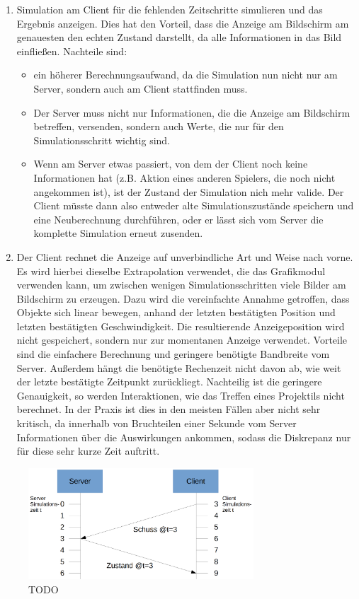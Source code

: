 \begin{enumerate}
\item Simulation am Client für die fehlenden Zeitschritte simulieren und das Ergebnis anzeigen. Dies hat den Vorteil, dass die Anzeige am Bildschirm am genauesten den echten Zustand darstellt, da alle Informationen in das Bild einfließen. Nachteile sind:
\begin{itemize}
 \item ein höherer Berechnungsaufwand, da die Simulation nun nicht nur am Server, sondern auch am Client stattfinden muss. 
 \item Der Server muss nicht nur Informationen, die die Anzeige am Bildschirm betreffen, versenden, sondern auch Werte, die nur für den Simulationsschritt wichtig sind.
 \item Wenn am Server etwas passiert, von dem der Client noch keine Informationen hat (z.B. Aktion eines anderen Spielers, die noch nicht angekommen ist), ist der Zustand der Simulation nich mehr valide. Der Client müsste dann also entweder alte Simulationszustände speichern und eine Neuberechnung durchführen, oder er lässt sich vom Server die komplette Simulation erneut zusenden.
\end{itemize}
\item Der Client rechnet die Anzeige auf unverbindliche Art und Weise nach vorne. Es wird hierbei dieselbe Extrapolation verwendet, die das Grafikmodul verwenden kann, um zwischen wenigen Simulationsschritten viele Bilder am Bildschirm zu erzeugen. Dazu wird die vereinfachte Annahme getroffen, dass Objekte sich linear bewegen, anhand der letzten bestätigten Position und letzten bestätigten Geschwindigkeit. Die resultierende Anzeigeposition wird nicht gespeichert, sondern nur zur momentanen Anzeige verwendet. Vorteile sind die einfachere Berechnung und geringere benötigte Bandbreite vom Server. Außerdem hängt die benötigte Rechenzeit nicht davon ab, wie weit der letzte bestätigte Zeitpunkt zurückliegt. Nachteilig ist die geringere Genauigkeit, so werden Interaktionen, wie das Treffen eines Projektils nicht berechnet. In der Praxis ist dies in den meisten Fällen aber nicht sehr kritisch, da innerhalb von Bruchteilen einer Sekunde vom Server Informationen über die Auswirkungen ankommen, sodass die Diskrepanz nur für diese sehr kurze Zeit auftritt.
\end{enumerate}
\begin{figure}
    \centering
    \includegraphics[width=0.75\textwidth]{./Zeichnung2a.png}
    \caption{TODO}
    \label{fig:zeichnung2a}
\end{figure}
